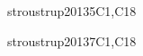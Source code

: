 \begin{syllabus}
\begin{unit}{\PLBasicTypeSystems}{}{stroustrup2013}{5}{C1,C18}
\begin{topics}
	\item \PLBasicTypeSystemsTopicA
	\item \PLBasicTypeSystemsTopicAssociation
	\item \PLBasicTypeSystemsTopicType
	\item \PLBasicTypeSystemsTopicGoals
	\item \PLBasicTypeSystemsTopicGeneric
	\item \PLBasicTypeSystemsTopicComplementary
\end{topics}

\begin{learningoutcomes}
	\item \PLBasicTypeSystemsLOForBoth [\Usage]
	\item \PLBasicTypeSystemsLOForA [\Usage]
	\item \PLBasicTypeSystemsLODescribeExamples [\Usage] 
	\item \PLBasicTypeSystemsLOForMultiple [\Usage]
	\item \PLBasicTypeSystemsLOGiveAnThat [\Usage]
	\item \PLBasicTypeSystemsLOUseTypes [\Usage]
	\item \PLBasicTypeSystemsLOExplainHowDefine [\Usage]
	\item \PLBasicTypeSystemsLOWriteDown [\Usage]
	\item \PLBasicTypeSystemsLOExplainWhyType [\Usage]
	\item \PLBasicTypeSystemsLODefineAndPieces [\Usage]
	\item \PLBasicTypeSystemsLODiscussTheGenerics [\Usage]
	\item \PLBasicTypeSystemsLOExplainMultiple [\Usage]
\end{learningoutcomes}
\end{unit}

\begin{unit}{\PLObjectOrientedProgramming}{}{stroustrup2013}{7}{C1,C18}
\begin{topics}
	\item \PLObjectOrientedProgrammingTopicObject
	\item \PLObjectOrientedProgrammingTopicDefinition
	\item \PLObjectOrientedProgrammingTopicSubclasses
	\item \PLObjectOrientedProgrammingTopicDynamic
	\item \PLObjectOrientedProgrammingTopicSubtyping
	\item \PLObjectOrientedProgrammingTopicObjectOriented
	\item \PLObjectOrientedProgrammingTopicUsing
\end{topics}


\end{unit}
\end{syllabus}
